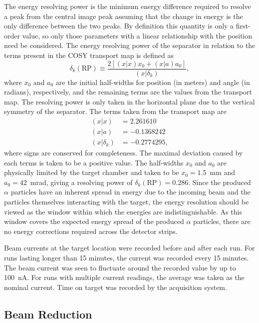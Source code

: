The energy resolving power is the minimum energy difference required to
resolve a peak from the central image peak assuming that the change in
energy is the only difference between the two peaks. By definition this
quantity is only a first-order value, so only those parameters with a
linear relationship with the position need be considered. The energy
resolving power of the separator in relation to the terms present in the
COSY transport map is defined as
\begin{equation}
    \delta_k(\textrm{RP}) \equiv
        \frac{2\left[(x|x)x_0 + (x|a)a_0\right]}{(x|\delta_k)},
\end{equation}
where $x_0$ and $a_0$ are the initial half-widths for position (in
meters) and angle (in radians), respectively, and the remaining terms
are the values from the transport map. The resolving power is only taken
in the horizontal plane due to the vertical symmetry of the separator.
The terms taken from the transport map are
\begin{align*}
    (x|x) &= 2.261610 \\
    (x|a) &= {-0.1368242} \\
    (x|\delta_k) &= {-0.2774295},
\end{align*}
where signs are conserved for completeness. The maximal deviation caused
by each terms is taken to be a positive value. The half-widths $x_0$ and
$a_0$ are physically limited by the target chamber and taken to be $x_0
= 1.5$~mm and $a_0 = 42$~mrad, giving a resolving power of
$\delta_k(\textrm{RP}) = 0.286$. Since the produced $\alpha$ particles
have an inherent spread in energy due to the incoming beam and the
particles themselves interacting with the target, the energy resolution
should be viewed as the window within which the energies are
indistinguishable. As this window covers the expected energy spread of
the produced $\alpha$ particles, there are no energy corrections
required across the detector strips.

Beam currents at the target location were recorded before and after each
run. For runs lasting longer than 15 minutes, the current was recorded
every 15 minutes. The beam current was seen to fluctuate around the
recorded value by up to 100~nA. For runs with multiple current readings,
the average was taken as the nominal current. Time on target was
recorded by the acquisition system.

\subsection{Beam Reduction}

